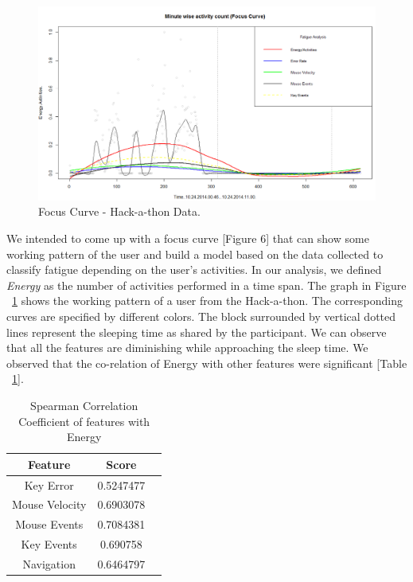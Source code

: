 \documentclass{acm_proc_article-sp}
\begin{document}
	\begin{figure}
		\centering
		\includegraphics[width=1\textwidth,natwidth=1261,natheight=726]{focusCurveHack.png}
		\caption{Focus Curve - Hack-a-thon Data.}
		\label{fig:hackUser}
  	\end{figure}
We intended to come up with a focus curve [Figure 6] that can show some working
pattern of the user and build a model based on the data collected to classify
fatigue depending on the user's activities. In our analysis, we defined
\textit{Energy} as the number of activities performed in a time span.
The graph in Figure ~\ref{fig:hackUser} shows the working pattern of a user from
the Hack-a-thon. The corresponding curves are specified by different colors. The
block surrounded by vertical dotted lines represent the sleeping time as shared
by the participant. We can observe that all the features are diminishing while
approaching the sleep time. We observed that the co-relation of Energy with
other features were significant [Table ~\ref{table:question}].
	\begin{table}
		\centering
		\caption{Spearman Correlation Coefficient of features with Energy}
		\begin{tabular}{|c|c|l|} \hline
			Feature&Score\\ \hline
			Key Error & 0.5247477\\ \hline
			Mouse Velocity & 0.6903078\\ \hline
			Mouse Events & 0.7084381\\ \hline
			Key Events & 0.690758\\ \hline
			Navigation & 0.6464797\\ \hline
		\end{tabular}
		\label{table:question}
	\end{table}
	
\end{document}
